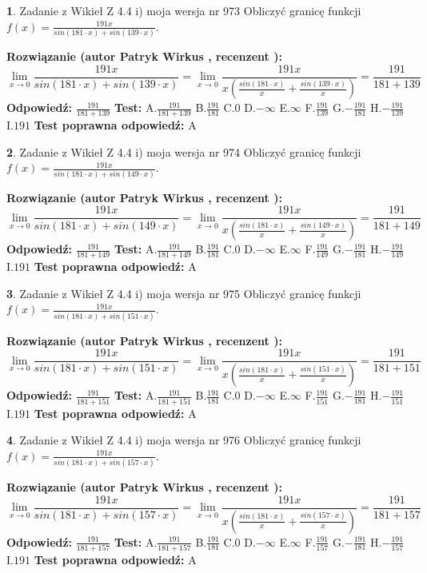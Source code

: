 \documentclass[12pt, a4paper]{article}
\theoremstyle{definition} %
\newtheorem{zad}{}
\newcommand{\zadStart}[1]{\begin{zad}#1\newline}
\newcommand{\zadStop}{\end{zad}}
\newcommand{\rozwStart}[2]{\noindent \textbf{Rozwiązanie (autor #1 , recenzent #2): }\newline}
\newcommand{\rozwStop}{\newline}
\newcommand{\odpStart}{\noindent \textbf{Odpowiedź:}\newline}
\newcommand{\odpStop}{\newline}
\newcommand{\testStart}{\noindent \textbf{Test:}\newline}
\newcommand{\testStop}{\newline}
\newcommand{\kluczStart}{\noindent \textbf{Test poprawna odpowiedź:}\newline}
\newcommand{\kluczStop}{\newline}
\begin{document}
\zadStart{Zadanie z Wikieł Z 4.4 i) moja wersja nr 973}
Obliczyć granicę funkcji $f(x)=\frac{191x}{sin(181\cdot x) +sin(139\cdot x)}$.
\zadStop
\rozwStart{Patryk Wirkus}{}
$$\lim\limits_{x\to 0}\frac{191x}{sin(181\cdot x) +sin(139\cdot x)}=\lim\limits_{x\to 0}\frac{191x}{x(\frac{sin(181\cdot x)}{x}+\frac{sin(139\cdot x)}{x})}=\frac{191}{181+139}$$
\rozwStop
\odpStart
$\frac{191}{181+139}$
\odpStop
\testStart
A.$\frac{191}{181+139}$
B.$\frac{191}{181}$
C.$0$
D.$-\infty$
E.$\infty$
F.$\frac{191}{139}$
G.$-\frac{191}{181}$
H.$-\frac{191}{139}$
I.$191$
\testStop
\kluczStart
A
\kluczStop



\zadStart{Zadanie z Wikieł Z 4.4 i) moja wersja nr 974}
Obliczyć granicę funkcji $f(x)=\frac{191x}{sin(181\cdot x) +sin(149\cdot x)}$.
\zadStop
\rozwStart{Patryk Wirkus}{}
$$\lim\limits_{x\to 0}\frac{191x}{sin(181\cdot x) +sin(149\cdot x)}=\lim\limits_{x\to 0}\frac{191x}{x(\frac{sin(181\cdot x)}{x}+\frac{sin(149\cdot x)}{x})}=\frac{191}{181+149}$$
\rozwStop
\odpStart
$\frac{191}{181+149}$
\odpStop
\testStart
A.$\frac{191}{181+149}$
B.$\frac{191}{181}$
C.$0$
D.$-\infty$
E.$\infty$
F.$\frac{191}{149}$
G.$-\frac{191}{181}$
H.$-\frac{191}{149}$
I.$191$
\testStop
\kluczStart
A
\kluczStop



\zadStart{Zadanie z Wikieł Z 4.4 i) moja wersja nr 975}
Obliczyć granicę funkcji $f(x)=\frac{191x}{sin(181\cdot x) +sin(151\cdot x)}$.
\zadStop
\rozwStart{Patryk Wirkus}{}
$$\lim\limits_{x\to 0}\frac{191x}{sin(181\cdot x) +sin(151\cdot x)}=\lim\limits_{x\to 0}\frac{191x}{x(\frac{sin(181\cdot x)}{x}+\frac{sin(151\cdot x)}{x})}=\frac{191}{181+151}$$
\rozwStop
\odpStart
$\frac{191}{181+151}$
\odpStop
\testStart
A.$\frac{191}{181+151}$
B.$\frac{191}{181}$
C.$0$
D.$-\infty$
E.$\infty$
F.$\frac{191}{151}$
G.$-\frac{191}{181}$
H.$-\frac{191}{151}$
I.$191$
\testStop
\kluczStart
A
\kluczStop



\zadStart{Zadanie z Wikieł Z 4.4 i) moja wersja nr 976}
Obliczyć granicę funkcji $f(x)=\frac{191x}{sin(181\cdot x) +sin(157\cdot x)}$.
\zadStop
\rozwStart{Patryk Wirkus}{}
$$\lim\limits_{x\to 0}\frac{191x}{sin(181\cdot x) +sin(157\cdot x)}=\lim\limits_{x\to 0}\frac{191x}{x(\frac{sin(181\cdot x)}{x}+\frac{sin(157\cdot x)}{x})}=\frac{191}{181+157}$$
\rozwStop
\odpStart
$\frac{191}{181+157}$
\odpStop
\testStart
A.$\frac{191}{181+157}$
B.$\frac{191}{181}$
C.$0$
D.$-\infty$
E.$\infty$
F.$\frac{191}{157}$
G.$-\frac{191}{181}$
H.$-\frac{191}{157}$
I.$191$
\testStop
\kluczStart
A
\kluczStop
\end{document}

